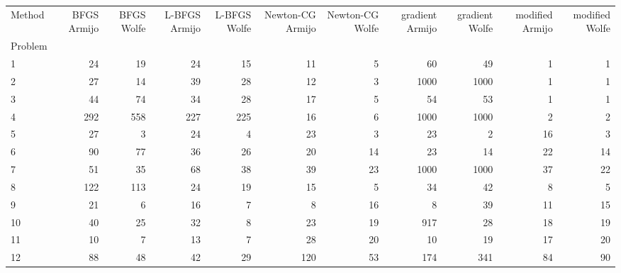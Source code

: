 \begin{tabular}{lrrrrrrrrrr}
\toprule
Method &  BFGS Armijo &  BFGS Wolfe &  L-BFGS Armijo &  L-BFGS Wolfe &  Newton-CG Armijo &  Newton-CG Wolfe &  gradient Armijo &  gradient Wolfe &  modified Armijo &  modified Wolfe \\
Problem &              &             &                &               &                   &                  &                  &                 &                  &                 \\
\midrule
1       &           24 &          19 &             24 &            15 &                11 &                5 &               60 &              49 &                1 &               1 \\
2       &           27 &          14 &             39 &            28 &                12 &                3 &             1000 &            1000 &                1 &               1 \\
3       &           44 &          74 &             34 &            28 &                17 &                5 &               54 &              53 &                1 &               1 \\
4       &          292 &         558 &            227 &           225 &                16 &                6 &             1000 &            1000 &                2 &               2 \\
5       &           27 &           3 &             24 &             4 &                23 &                3 &               23 &               2 &               16 &               3 \\
6       &           90 &          77 &             36 &            26 &                20 &               14 &               23 &              14 &               22 &              14 \\
7       &           51 &          35 &             68 &            38 &                39 &               23 &             1000 &            1000 &               37 &              22 \\
8       &          122 &         113 &             24 &            19 &                15 &                5 &               34 &              42 &                8 &               5 \\
9       &           21 &           6 &             16 &             7 &                 8 &               16 &                8 &              39 &               11 &              15 \\
10      &           40 &          25 &             32 &             8 &                23 &               19 &              917 &              28 &               18 &              19 \\
11      &           10 &           7 &             13 &             7 &                28 &               20 &               10 &              19 &               17 &              20 \\
12      &           88 &          48 &             42 &            29 &               120 &               53 &              174 &             341 &               84 &              90 \\
\bottomrule
\end{tabular}
